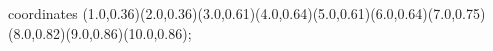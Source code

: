 					coordinates { (1.0,0.36)(2.0,0.36)(3.0,0.61)(4.0,0.64)(5.0,0.61)(6.0,0.64)(7.0,0.75)(8.0,0.82)(9.0,0.86)(10.0,0.86)};
